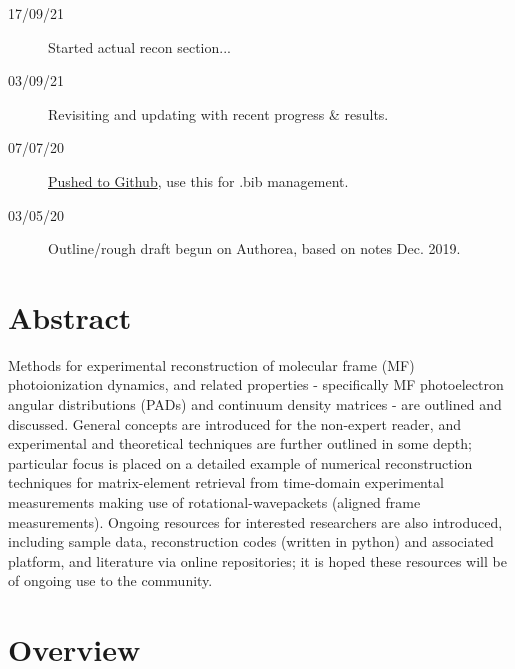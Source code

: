 \documentclass[10pt]{article}
\begin{document}
\begin{description}
\item [{17/09/21}] Started actual recon section...
\item [{03/09/21}] Revisiting and updating with recent progress \& results.
\item [{07/07/20}] \href{https://github.com/phockett/Extracting-Molecular-Frame-Photoionization-Dynamics-from-Experimental-Data}{Pushed to Github}, use this for .bib management.
\item [{03/05/20}] Outline/rough draft begun on Authorea, based on notes Dec. 2019.
\end{description}

\section{Abstract}

Methods for experimental reconstruction of molecular frame (MF) photoionization dynamics, and related properties - specifically MF photoelectron angular distributions (PADs) and continuum density matrices - are outlined and discussed. General concepts are introduced for the non-expert reader, and experimental and theoretical techniques are further outlined in some depth; particular focus is placed on a detailed example of numerical reconstruction techniques for matrix-element retrieval from time-domain experimental measurements making use of rotational-wavepackets (aligned frame measurements). Ongoing resources for interested researchers are also introduced, including sample data, reconstruction codes (written in python) and associated platform, and literature via online repositories; it is hoped these resources will be of ongoing use to the community.

\section{Overview}
\end{document}
